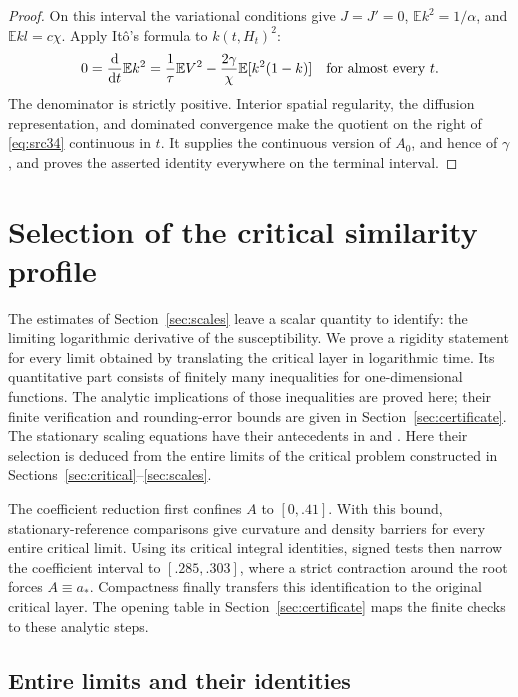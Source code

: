 \documentclass[11pt,a4paper]{article}
\numberwithin{equation}{section}
\theoremstyle{definition}
\theoremstyle{remark}
\newcommand{\E}{\mathbb E}
\newcommand{\dd}{\mathrm d}
\begin{document}
\begin{proof}
On this interval the variational conditions give
$J=J'=0$, $\E k^2=1/\alpha$, and $\E kl=c\chi$.
Apply It\^o's formula to $k(t,H_t)^2$:
\[
 0=\frac{\dd}{\dd t}\E k^2
   =\frac1\tau\E V^2-\frac{2\gamma}{\chi}\E[k^2(1-k)]
 \quad\hbox{for almost every }t.
\]
The denominator is strictly positive. Interior spatial regularity,
the diffusion representation, and dominated convergence make the
quotient on the right of \eqref{eq:src34} continuous in $t$.
It supplies the continuous version of $A_0$, and hence of $\gamma$,
and proves the asserted identity everywhere on the terminal interval.
\end{proof}


\section{Selection of the critical similarity profile}
\label{sec:contraction}

The estimates of Section~\ref{sec:scales} leave a scalar quantity to
identify: the limiting logarithmic derivative of the susceptibility.
We prove a rigidity statement for every limit obtained by translating
the critical layer in logarithmic time.  Its quantitative part consists
of finitely many inequalities for one-dimensional functions.  The
analytic implications of those inequalities are proved here; their
finite verification and rounding-error bounds are given in
Section~\ref{sec:certificate}.
The stationary scaling equations have their antecedents in
\cite[Section IX]{CKPUZ2014} and \cite[Section V]{FPSUZ2017}.
Here their selection is deduced from the entire limits of the critical
problem constructed in Sections~\ref{sec:critical}--\ref{sec:scales}.

The coefficient reduction first confines $A$ to $[0,.41]$. With this
bound, stationary-reference comparisons give curvature and density
barriers for every entire critical limit. Using its critical integral
identities, signed tests then narrow the coefficient interval to
$[.285,.303]$, where a strict contraction around the root forces
$A\equiv a_*$. Compactness finally transfers this identification to the
original critical layer. The opening table in Section~\ref{sec:certificate}
maps the finite checks to these analytic steps.

\subsection{Entire limits and their identities}
\end{document}
